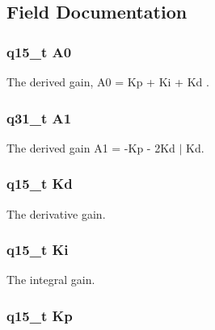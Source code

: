 \subsection{Field Documentation}
\hypertarget{structarm__pid__instance__q15_a1aa73268c65cea0c7bc66bb70ff35205}{
\subsubsection[{A0}]{\setlength{\rightskip}{0pt plus 5cm}q15\-\_\-t A0}}\label{structarm__pid__instance__q15_a1aa73268c65cea0c7bc66bb70ff35205}
The derived gain, A0 = Kp + Ki + Kd . \hypertarget{structarm__pid__instance__q15_aeb897c84724b56948e4222aca8d0e1f4}{
\subsubsection[{A1}]{\setlength{\rightskip}{0pt plus 5cm}q31\-\_\-t A1}}\label{structarm__pid__instance__q15_aeb897c84724b56948e4222aca8d0e1f4}
The derived gain A1 = -\/\-Kp -\/ 2\-Kd $|$ Kd. \hypertarget{structarm__pid__instance__q15_abf38d18de1e16bc6d86846fedf8534fe}{
\subsubsection[{Kd}]{\setlength{\rightskip}{0pt plus 5cm}q15\-\_\-t Kd}}\label{structarm__pid__instance__q15_abf38d18de1e16bc6d86846fedf8534fe}
The derivative gain. \hypertarget{structarm__pid__instance__q15_a19d5059baf06dd52266260d096702d0a}{
\subsubsection[{Ki}]{\setlength{\rightskip}{0pt plus 5cm}q15\-\_\-t Ki}}\label{structarm__pid__instance__q15_a19d5059baf06dd52266260d096702d0a}
The integral gain. \hypertarget{structarm__pid__instance__q15_afef61fb3b64c73f2cd0c91d9dcf95679}{
\subsubsection[{Kp}]{\setlength{\rightskip}{0pt plus 5cm}q15\-\_\-t Kp}}\label{structarm__pid__instance__q15_afef61fb3b64c73f2cd0c91d9dcf95679}
